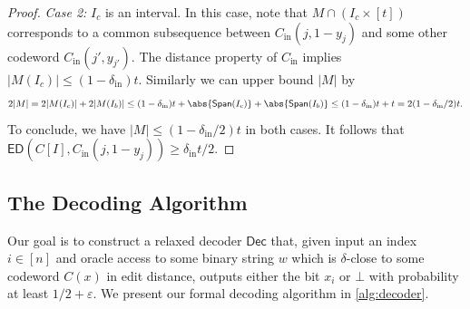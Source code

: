 \documentclass[10pt,a4paper]{article}
\theoremstyle{remark}
\newcommand{\tuple}[1]{\ensuremath{\left(#1\right)}}
\newcommand{\tp}{\tuple}
\newcommand{\eps}{\ensuremath{\varepsilon}}
\newcommand{\Dec}{\ensuremath{\mathsf{Dec}}\xspace}
\newcommand{\ED}{\ensuremath{\mathsf{ED}}\xspace}%
\newcommand{\Cin}{C_{\text{in}}}
\newcommand{\din}{\delta_{\text{in}}}
\begin{document}
\begin{proof}
\textit{Case 2:} $I_c$ is an interval.
In this case, note that $M \cap (I_c \times [t])$ corresponds to a common subsequence between $\Cin(j,1-y_j)$ and some other codeword $\Cin(j', y_{j'})$. 
The distance property of $\Cin$ implies $|M(I_c)| \le (1-\din)t$.
Similarly we can upper bound $|M|$ by
\begin{align*}
	2|M| = 2|M(I_c)| + 2|M(I_b)| \le (1-\din)t + \abs{\textsf{Span}(I_c)} + \abs{\textsf{Span}(I_b)} \le (1-\din)t + t = 2(1-\din/2)t.
\end{align*}
To conclude, we have $|M| \le (1-\din/2)t$ in both cases. It follows that $\ED\tp{C[I], \Cin(j,1-y_j)}\ge \din t/2$.
\end{proof}

\subsection{The Decoding Algorithm}\label{sec:wrldc-dec}
Our goal is to construct a relaxed decoder $\Dec$ that, given input an index $i \in [n]$ and oracle access to some binary string $w$ which is $\delta$-close to some codeword $C(x)$ in edit distance, outputs either the bit $x_i$ or $\bot$ with probability at least $1/2 + \eps$. 
We present our formal decoding algorithm in \cref{alg:decoder}.
\end{document}
